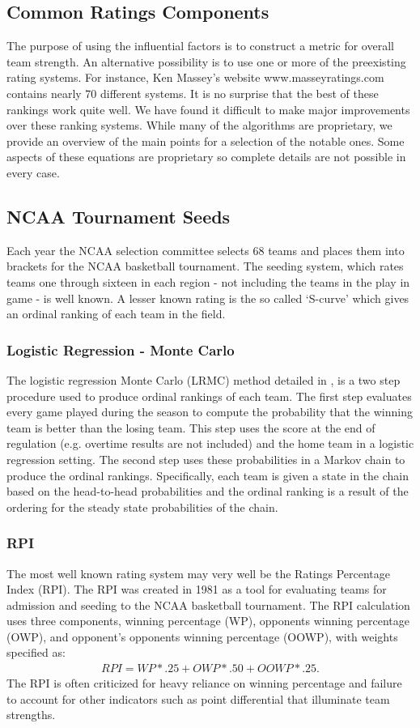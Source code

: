 \subsection{Common Ratings Components} The purpose of using the influential factors is to construct a metric for overall team strength.  An alternative possibility is to use one or more of the preexisting rating systems.  For instance, Ken Massey's website www.masseyratings.com contains nearly 70 different systems.  It is no surprise that the best of these rankings work quite well.  We have found it difficult to make major improvements over these ranking systems.  While many of the algorithms are proprietary, we provide an overview of the main points for a selection of the notable ones.  Some aspects of these equations are proprietary so complete details are not possible in every case. 
\subsection{NCAA Tournament Seeds}
Each year the NCAA selection committee selects 68 teams and places them into brackets for the NCAA basketball tournament.  The seeding system, which rates teams one through sixteen in each region - not including the teams in the play in game - is well known.  A lesser known rating is the so called `S-curve' which gives an ordinal ranking of each team in the field.  
\subsubsection{Logistic Regression - Monte Carlo}
The logistic regression Monte Carlo (LRMC) method detailed in \cite{Kvam2006}, \cite{mark2010} is a two step procedure used to produce ordinal rankings of each team.  The first step evaluates every game played during the season to compute the probability that the winning team is better than the losing team.  This step uses the score at the end of regulation (e.g. overtime results are not included) and the home team in a logistic regression setting.  The second step uses these probabilities in a Markov chain to produce the ordinal rankings.  Specifically, each team is given a state in the chain based on the head-to-head probabilities and the ordinal ranking is a result of the ordering for the steady state probabilities of the chain.

\subsubsection{RPI}
The most well known rating system may very well be the Ratings Percentage Index (RPI).  The RPI was created in 1981 as a tool for evaluating teams for admission and seeding to the NCAA basketball tournament.  The RPI calculation uses three components, winning percentage (WP), opponents winning percentage (OWP), and opponent's opponents winning percentage (OOWP), with weights specified as:
\begin{eqnarray*}
RPI = WP *.25 + OWP * .50 + OOWP *.25.
\end{eqnarray*}
The RPI is often criticized for heavy reliance on winning percentage and failure to account for other indicators such as point differential that illuminate team strengths.

